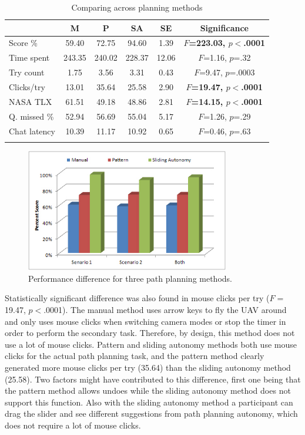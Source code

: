 \documentclass[lettersize, apacite, twoside, HRI]{apa_HRI}
\begin{document}
\begin{table}
\caption{Comparing across planning methods}
\scriptsize
	\centering
		\begin{tabular}
			{|l|c|c|c|c|c|}
			\hline
			& M & P & SA & SE & Significance \\
			\hline
			Score \% & 59.40 & 72.75 & 94.60 & 1.39 & \textbf{$F$=223.03, $p<$.0001} \\
			Time spent & 243.35 & 240.02 & 228.37 & 12.06 & $F$=1.16, $p$=.32 \\
			Try count & 1.75 & 3.56 & 3.31 & 0.43 & $F$=9.47, $p$=.0003 \\
			Clicks/try & 13.01 & 35.64 & 25.58 & 2.90 & \textbf{$F$=19.47, $p<$.0001} \\
			NASA TLX & 61.51 & 49.18 & 48.86 & 2.81 & \textbf{$F$=14.15, $p<$.0001} \\
			\hline
			Q. missed \% & 52.94 & 56.69 & 55.04 & 5.17 & $F$=1.26, $p$=.29 \\
			Chat latency & 10.39 & 11.17 & 10.92 & 0.65 & $F$=0.46, $p$=.63 \\
			\hline			
			\multicolumn{6}{c}{}  %
		\end{tabular}
\label{AcrossMethods}
\end{table}

\begin{figure}
\centering
\includegraphics[width=3.5in]{PerformanceDifference.JPG}
\caption{Performance difference for three path planning methods.}
\label{PerformanceDifference}
\end{figure}

Statistically significant difference was also found in mouse clicks per try ($F=$19.47, $p<$.0001). The manual method uses arrow keys to fly the UAV around and only uses mouse clicks when switching camera modes or stop the timer in order to perform the secondary task. Therefore, by design, this method does not use a lot of mouse clicks. Pattern and sliding autonomy methods both use mouse clicks for the actual path planning task, and the pattern method clearly generated more mouse clicks per try (35.64) than the sliding autonomy method (25.58). Two factors might have contributed to this difference, first one being that the pattern method allows undoes while the sliding autonomy method does not support this function. Also with the sliding autonomy method a participant can drag the slider and see different suggestions from path planning autonomy, which does not require a lot of mouse clicks.
\end{document}
